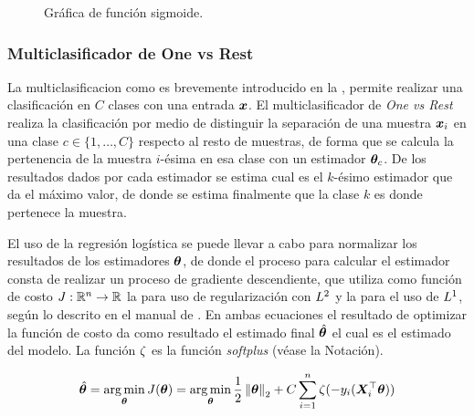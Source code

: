 \begin{figure}[H]
  \centering
\decoRule
\caption[Gráfica de función sigmoide]{Gráfica de función sigmoide.}
\label{fig:logits-example}
\end{figure}


\subsubsection{Multiclasificador de One vs Rest}
La multiclasificacion como es brevemente introducido en la , permite realizar una clasificación en $C$ clases con una entrada ${\bm{x}}$. El multiclasificador de \emph{One vs Rest} realiza la clasificación por medio de distinguir la separación de una muestra ${\bm{x}}_i$ en una clase $c \in \{1, \ldots, C\}$ respecto al resto de muestras, de forma que se calcula la pertenencia de la muestra $i$-\'esima en esa clase con un estimador ${\bm{\theta}}_c$. De los resultados dados por cada estimador se estima cual es el $k$-\'esimo estimador que da el máximo valor, de donde se estima finalmente que la clase $k$ es donde pertenece la muestra.

El uso de la regresión logística se puede llevar a cabo para normalizar los resultados de los estimadores ${\bm{\theta}}$, de donde el proceso para calcular el estimador consta de realizar un proceso de gradiente descendiente, que utiliza como función de costo $J: \mathbb{R}^n \rightarrow \mathbb{R}$ la  para uso de regularización con $L^2$ y la  para el uso de $L^1$, según lo descrito en el manual de \cite{sklearn_api}. En ambas ecuaciones el resultado de optimizar la función de costo da como resultado el estimado final $\hat{{\bm{\theta}}}$ el cual es el estimado del modelo. La función $\zeta$ es la función \emph{softplus} (véase la Notación).

\begin{equation} \label{eq:ovr-reg-l2costfunc}
  \hat{{\bm{\theta}}} = \operatorname*{arg\,min}_{{\bm{\theta}}} J({\bm{\theta}}) = \operatorname*{arg\,min}_{{\bm{\theta}}} \frac{1}{2}\left\lVert{\bm{\theta}}\right\rVert_2 + C \sum_{i=1}^n \zeta(- y_i ({\bm{X}}_i^{\top} {\bm{\theta}}))
\end{equation}

